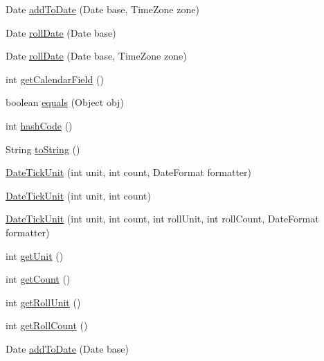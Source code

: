 \begin{DoxyCompactItemize}
\item 
Date \mbox{\hyperlink{classorg_1_1jfree_1_1chart_1_1axis_1_1_date_tick_unit_ab38d03b8c2c07df7637733044043524d}{add\+To\+Date}} (Date base, Time\+Zone zone)
\item 
Date \mbox{\hyperlink{classorg_1_1jfree_1_1chart_1_1axis_1_1_date_tick_unit_adc12d633c56a6df91f743a36e79aa95b}{roll\+Date}} (Date base)
\item 
Date \mbox{\hyperlink{classorg_1_1jfree_1_1chart_1_1axis_1_1_date_tick_unit_a2c33bd77b76cc0ff127b39d4e399cf8e}{roll\+Date}} (Date base, Time\+Zone zone)
\item 
int \mbox{\hyperlink{classorg_1_1jfree_1_1chart_1_1axis_1_1_date_tick_unit_a78ca2ba8ac19fcc2c7fc22c40a2b8c94}{get\+Calendar\+Field}} ()
\item 
boolean \mbox{\hyperlink{classorg_1_1jfree_1_1chart_1_1axis_1_1_date_tick_unit_a12b7de1fd09c48dc9a46989e013e0106}{equals}} (Object obj)
\item 
int \mbox{\hyperlink{classorg_1_1jfree_1_1chart_1_1axis_1_1_date_tick_unit_a8bcaf93f97c1d434ae3a84e0957001b8}{hash\+Code}} ()
\item 
String \mbox{\hyperlink{classorg_1_1jfree_1_1chart_1_1axis_1_1_date_tick_unit_ae50d77936e2d1e6f3c1b8ee6d8763957}{to\+String}} ()
\item 
\mbox{\hyperlink{classorg_1_1jfree_1_1chart_1_1axis_1_1_date_tick_unit_ab535afe20256698fea9d7f0f3ce258ac}{Date\+Tick\+Unit}} (int unit, int count, Date\+Format formatter)
\item 
\mbox{\hyperlink{classorg_1_1jfree_1_1chart_1_1axis_1_1_date_tick_unit_a5af8f9f75475f7297672e2b83770503d}{Date\+Tick\+Unit}} (int unit, int count)
\item 
\mbox{\hyperlink{classorg_1_1jfree_1_1chart_1_1axis_1_1_date_tick_unit_af47823728787e1de8ba812e2e8bf2b96}{Date\+Tick\+Unit}} (int unit, int count, int roll\+Unit, int roll\+Count, Date\+Format formatter)
\item 
int \mbox{\hyperlink{classorg_1_1jfree_1_1chart_1_1axis_1_1_date_tick_unit_ab14b94a52e03839067716491e7872aee}{get\+Unit}} ()
\item 
int \mbox{\hyperlink{classorg_1_1jfree_1_1chart_1_1axis_1_1_date_tick_unit_a0744fba018d03283041af7bf8c6809c8}{get\+Count}} ()
\item 
int \mbox{\hyperlink{classorg_1_1jfree_1_1chart_1_1axis_1_1_date_tick_unit_a361da4f82440c919d106022afb7bd4e3}{get\+Roll\+Unit}} ()
\item 
int \mbox{\hyperlink{classorg_1_1jfree_1_1chart_1_1axis_1_1_date_tick_unit_a2d0ef9ef9d9c7b1f3a00e1e0b7ffe16b}{get\+Roll\+Count}} ()
\item 
Date \mbox{\hyperlink{classorg_1_1jfree_1_1chart_1_1axis_1_1_date_tick_unit_a60151f4a0caa2bc774f095992580929a}{add\+To\+Date}} (Date base)
\end{DoxyCompactItemize}
